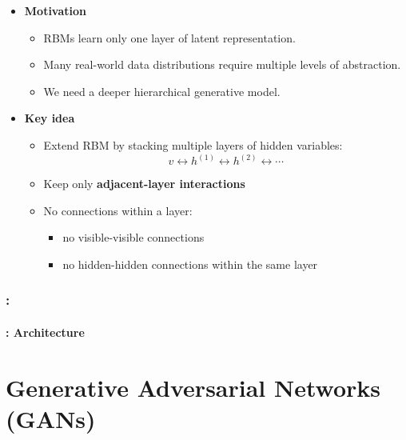 \documentclass[xcolor=table]{beamer}
\begin{document}
	\begin{subsectionframe}
		\begin{itemize}
			
			\item \textbf{Motivation}
			\begin{itemize}
				\item RBMs learn only one layer of latent representation.
				\item Many real-world data distributions require multiple levels of abstraction.
				\item We need a deeper hierarchical generative model.
			\end{itemize}
			
			\vspace{0.5em}
			
			\item \textbf{Key idea}
			\begin{itemize}
				\item Extend RBM by stacking multiple layers of hidden variables:
				\[
				v \leftrightarrow h^{(1)} \leftrightarrow h^{(2)} \leftrightarrow \cdots
				\]
				
				\item Keep only \textbf{adjacent-layer interactions}
				
				\item No connections within a layer:
				\begin{itemize}
					\item no visible-visible connections
					\item no hidden-hidden connections within the same layer
				\end{itemize}
			\end{itemize}
			
		\end{itemize}
	\end{subsectionframe}
	
	\begin{frame}
		\frametitle{\insertshortsubtitle: \insertsection}
		\framesubtitle{\insertsubsection: Architecture}
		
		
	\end{frame}
	
	\section{Generative Adversarial Networks (GANs)}
	
\end{document}
